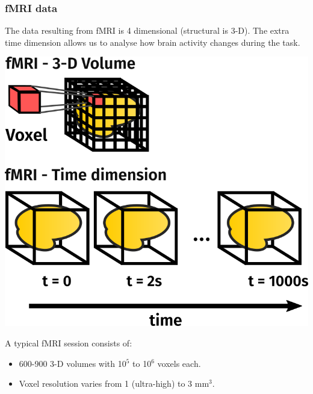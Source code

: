 \documentclass[11pt]{beamer}
\begin{document}
\begin{frame}
    \frametitle{fMRI data}

    The data resulting from fMRI is 4 dimensional (structural is 3-D). The extra
    time dimension allows us to analyse how brain activity changes during the
    task.

    \vspace*{-0.25cm}

    \begin{center}
        \includegraphics[scale=0.25]{figures/4d_data.png}
    \end{center}

    \vspace*{-0.6cm}

    A typical fMRI session consists of:
    \begin{itemize}
        \item 600-900 3-D volumes with 10$\mathrm{^5}$ to 10$\mathrm{^6}$ voxels each.
        \item Voxel resolution varies from 1 (ultra-high) to 3 mm$\mathrm{^3}$.
    \end{itemize}

\end{frame}
\end{document}
